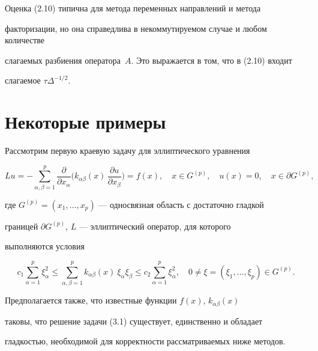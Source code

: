 Оценка (2.10) типична для метода переменных направлений и метода 


факторизации, но она справедлива в некоммутируемом случае и любом количестве 


слагаемых разбиения оператора~$A$. Это выражается в том, что в (2.10) входит


слагаемое $\tau\Delta^{-1/2}$. 





\section{Некоторые примеры}





Рассмотрим первую краевую задачу для эллиптического уравнения


\begin{equation}


Lu=-\sum\limits_{\alpha,\beta=1}^{p}\frac{\partial}{\partial x_\alpha}


\bigg(k_{\alpha\beta}(x)\,\frac{\partial u}{\partial x_\beta}\bigg)=f(x),


\quad x\in G^{(p)},\quad u(x)=0,\quad x\in\partial G^{(p)},


\end{equation}


где $G^{(p)}=(x_1,\dotsc,x_p)$ --- односвязная область с достаточно гладкой


границей $\partial G^{(p)}$, $L$ --- эл\-лип\-тический оператор, для которого


выполняются условия


\begin{equation}


c_1\sum\limits_{\alpha=1}^{p}\xi_\alpha^2\le


\sum\limits_{\alpha,\beta=1}^{p}k_{\alpha\beta}(x)\


\xi_\alpha\xi_\beta\le c_2\sum\limits_{\alpha=1}^{p}\xi_\alpha^2,


\quad 0\ne\xi=(\xi_1,\dotsc,\xi_p)\in G^{(p)}.


\end{equation}


Предполагается также, что известные функции $f(x)$, $k_{\alpha\beta}(x)$


таковы, что решение задачи (3.1) существует, единственно и обладает


гладкостью, необходимой для корректности рассматриваемых ниже методов.





